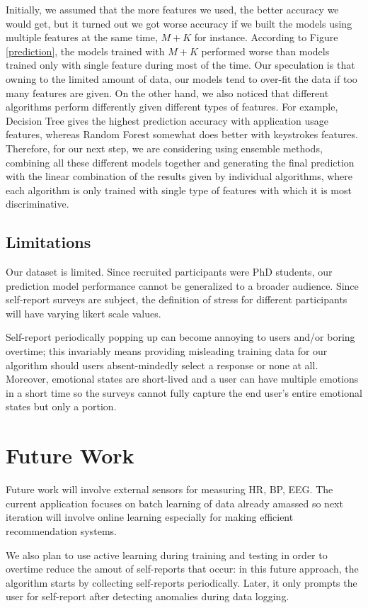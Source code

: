 \documentclass{article}
\begin{document}
Initially, we assumed that the more features we used, the better accuracy we would get, but it turned out we got worse accuracy if we built the models using multiple features at the same time, $M+K$ for instance. According to Figure \ref{prediction}, the models trained with $M+K$ performed worse than models trained only with single feature during most of the time. Our speculation is that owning to the limited amount of data, our models tend to over-fit the data if too many features are given. On the other hand, we also noticed that different algorithms perform differently given different types of features. For example, Decision Tree gives the highest prediction accuracy with application usage features, whereas Random Forest somewhat does better with keystrokes features. Therefore, for our next step, we are considering using ensemble methods, combining all these different models together and generating the final prediction with the linear combination of the results given by individual algorithms, where each algorithm is only trained with single type of features with which it is most discriminative.  
 
\subsection{Limitations}
Our dataset is limited. Since recruited participants were PhD students, our prediction model performance cannot be generalized to a broader audience. Since self-report surveys are subject, the definition of stress for different participants will have varying likert scale values. 

Self-report periodically popping up can become annoying to users and/or boring overtime; this invariably means providing misleading training data for our algorithm should users absent-mindedly select a response or none at all. Moreover, emotional states are short-lived and a user can have multiple emotions in a short time so the surveys cannot fully capture the end user's entire emotional states but only a portion.

\section{Future Work}
Future work will involve external sensors for measuring HR, BP, EEG. The current application focuses on batch learning of data already amassed so next iteration will involve online learning especially for making efficient recommendation systems. 

We also plan to use active learning during training and testing in order to overtime reduce the amout of self-reports that occur: in this future approach, the algorithm starts by collecting self-reports periodically. Later, it only prompts the user for self-report after detecting anomalies during data logging.
\end{document}
